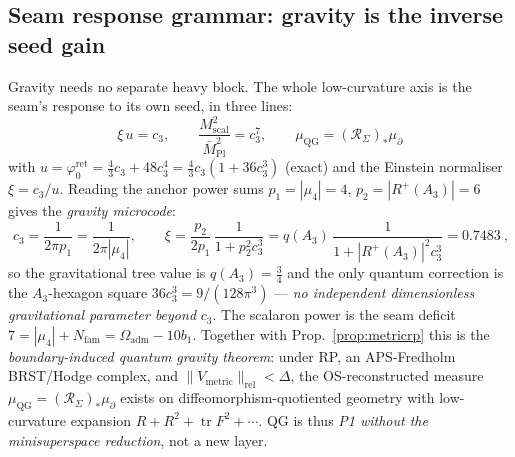 \documentclass[11pt,a4paper]{article}
\newcommand{\Mbar}{\bar M_{\mathrm{Pl}}}
\newcommand{\Nfam}{N_{\mathrm{fam}}}
\newcommand{\Oadm}{\Omega_{\mathrm{adm}}}
\newcommand{\cthree}{c_3}
\newcommand{\phiz}{\varphi_0^{\mathrm{ret}}}
\theoremstyle{definition}
\begin{document}
\subsection{Seam response grammar: gravity is the inverse seed gain}
Gravity needs no separate heavy block. The whole low-curvature axis is the seam's response to its own
seed, in three lines:
\[
  \boxed{\ \xi\,u=\cthree,\qquad \frac{M_{\mathrm{scal}}^2}{\Mbar^2}=\cthree^7,\qquad
  \mu_{\mathrm{QG}}=(\mathcal R_\Sigma)_*\mu_\partial\ }
\]
with $u=\phiz=\tfrac43\cthree+48\cthree^4=\tfrac43\cthree(1+36\cthree^3)$ (exact) and the Einstein
normaliser $\xi=\cthree/u$. Reading the anchor power sums $p_1=|\mu_4|=4$, $p_2=|R^+(A_3)|=6$ gives the
\emph{gravity microcode}:
\[
  \boxed{\ \cthree=\frac1{2\pi p_1}=\frac1{2\pi|\mu_4|},\qquad
  \xi=\frac{p_2}{2p_1}\,\frac1{1+p_2^2\cthree^3}=q(A_3)\,\frac1{1+|R^+(A_3)|^2\cthree^3}=0.7483\ },
\]
so the gravitational tree value is $q(A_3)=\tfrac34$ and the only quantum correction is the $A_3$-hexagon
square $36\cthree^3=9/(128\pi^3)$ --- \emph{no independent dimensionless gravitational parameter beyond}
$\cthree$. The scalaron power is the seam deficit $7=|\mu_4|+\Nfam=\Oadm-10b_1$. Together with
Prop.~\ref{prop:metricrp} this is the
\emph{boundary-induced quantum gravity theorem}: under RP, an APS-Fredholm BRST/Hodge complex, and
$\|V_{\mathrm{metric}}\|_{\mathrm{rel}}<\Delta$, the OS-reconstructed measure $\mu_{\mathrm{QG}}=(\mathcal
R_\Sigma)_*\mu_\partial$ exists on diffeomorphism-quotiented geometry with low-curvature expansion
$R+R^2+\operatorname{tr}F^2+\cdots$. QG is thus \emph{P1 without the minisuperspace reduction}, not a new
layer.
\end{document}
